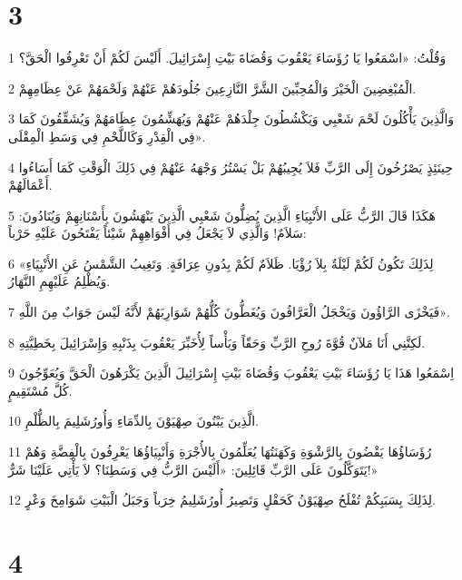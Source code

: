 \chapter{3}

\par 1 وَقُلْتُ: «اسْمَعُوا يَا رُؤَسَاءَ يَعْقُوبَ وَقُضَاةَ بَيْتِ إِسْرَائِيلَ. أَلَيْسَ لَكُمْ أَنْ تَعْرِفُوا الْحَقَّ؟
\par 2 الْمُبْغِضِينَ الْخَيْرَ وَالْمُحِبِّينَ الشَّرَّ النَّازِعِينَ جُلُودَهُمْ عَنْهُمْ وَلَحْمَهُمْ عَنْ عِظَامِهِمْ.
\par 3 وَالَّذِينَ يَأْكُلُونَ لَحْمَ شَعْبِي وَيَكْشُطُونَ جِلْدَهُمْ عَنْهُمْ وَيُهَشِّمُونَ عِظَامَهُمْ وَيُشَقِّقُونَ كَمَا فِي الْقِدْرِ وَكَاللَّحْمِ فِي وَسَطِ الْمِقْلَى».
\par 4 حِينَئِذٍ يَصْرُخُونَ إِلَى الرَّبِّ فَلاَ يُجِيبُهُمْ بَلْ يَسْتُرُ وَجْهَهُ عَنْهُمْ فِي ذَلِكَ الْوَقْتِ كَمَا أَسَاءُوا أَعْمَالَهُمْ.
\par 5 هَكَذَا قَالَ الرَّبُّ عَلَى الأَنْبِيَاءِ الَّذِينَ يُضِلُّونَ شَعْبِي الَّذِينَ يَنْهَشُونَ بِأَسْنَانِهِمْ وَيُنَادُونَ: سَلاَمٌ! وَالَّذِي لاَ يَجْعَلُ فِي أَفْوَاهِهِمْ شَيْئاً يَفْتَحُونَ عَلَيْهِ حَرْباً:
\par 6 «لِذَلِكَ تَكُونُ لَكُمْ لَيْلَةٌ بِلاَ رُؤْيَا. ظَلاَمٌ لَكُمْ بِدُونِ عِرَافَةٍ. وَتَغِيبُ الشَّمْسُ عَنِ الأَنْبِيَاءِ وَيُظْلِمُ عَلَيْهِمِ النَّهَارُ.
\par 7 فَيَخْزَى الرَّاؤُونَ وَيَخْجَلُ الْعَرَّافُونَ وَيُغَطُّونَ كُلُّهُمْ شَوَارِبَهُمْ لأَنَّهُ لَيْسَ جَوَابٌ مِنَ اللَّهِ».
\par 8 لَكِنَّنِي أَنَا مَلآنٌ قُوَّةَ رُوحِ الرَّبِّ وَحَقّاً وَبَأْساً لِأُخَبِّرَ يَعْقُوبَ بِذَنْبِهِ وَإِسْرَائِيلَ بِخَطِيَّتِهِ.
\par 9 اِسْمَعُوا هَذَا يَا رُؤَسَاءَ بَيْتِ يَعْقُوبَ وَقُضَاةَ بَيْتِ إِسْرَائِيلَ الَّذِينَ يَكْرَهُونَ الْحَقَّ وَيُعَوِّجُونَ كُلَّ مُسْتَقِيمٍ.
\par 10 الَّذِينَ يَبْنُونَ صِهْيَوْنَ بِالدِّمَاءِ وَأُورُشَلِيمَ بِالظُّلْمِ.
\par 11 رُؤَسَاؤُهَا يَقْضُونَ بِالرَّشْوَةِ وَكَهَنَتُهَا يُعَلِّمُونَ بِالأُجْرَةِ وَأَنْبِيَاؤُهَا يَعْرِفُونَ بِالْفِضَّةِ وَهُمْ يَتَوَكَّلُونَ عَلَى الرَّبِّ قَائِلِينَ: «أَلَيْسَ الرَّبُّ فِي وَسَطِنَا؟ لاَ يَأْتِي عَلَيْنَا شَرٌّ!»
\par 12 لِذَلِكَ بِسَبَبِكُمْ تُفْلَحُ صِهْيَوْنُ كَحَقْلٍ وَتَصِيرُ أُورُشَلِيمُ خِرَباً وَجَبَلُ الْبَيْتِ شَوَامِخَ وَعْرٍ.

\chapter{4}

